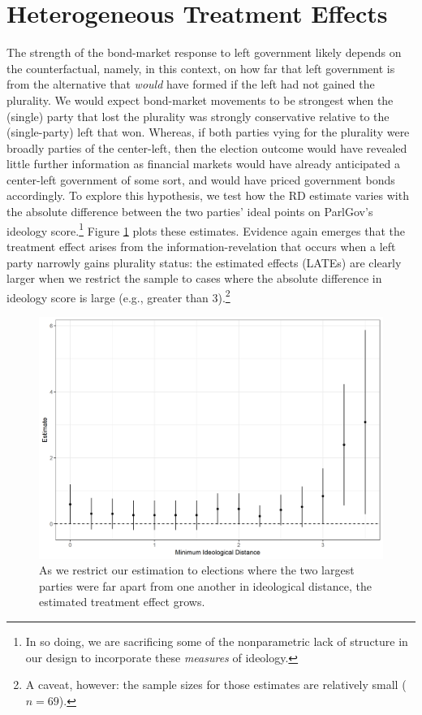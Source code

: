 \documentclass[12pt]{article}
\begin{document}
\section{Heterogeneous Treatment Effects}

The strength of the bond-market response to left government likely depends on the counterfactual, namely, in this context, on how far that left government is from the alternative that \textit{would} have formed if the left had not gained the plurality. We would expect bond-market movements to be strongest when the (single) party that lost the plurality was strongly conservative relative to the (single-party) left that won. Whereas, if both parties vying for the plurality were broadly parties of the center-left, then the election outcome would have revealed little further information as financial markets would have already anticipated a center-left government of some sort, and would have priced government bonds accordingly. To explore this hypothesis, we test how the RD estimate varies with the absolute difference between the two parties' ideal points on ParlGov's ideology score.\footnote{In so doing, we are sacrificing some of the nonparametric lack of structure in our design to incorporate these \textit{measures} of ideology.} Figure \ref{fig:rdEstimateVaryingIdeologyDistance} plots these estimates. Evidence again emerges that the treatment effect arises from the information-revelation that occurs when a left party narrowly gains plurality status: the estimated effects (LATEs) are clearly larger when we restrict the sample to cases where the absolute difference in ideology score is large (e.g., greater than 3).\footnote{A caveat, however: the sample sizes for those estimates are relatively small ($n = 69$).}

\begin{figure}[h]
	\centering
	\includegraphics[width=\linewidth]{Figures/rdEstimateVaryingIdeologyDistance}
	\caption{As we restrict our estimation to elections where the two largest parties were far apart from one another in ideological distance, the estimated treatment effect grows.}
	\label{fig:rdEstimateVaryingIdeologyDistance}
\end{figure}
\end{document}
